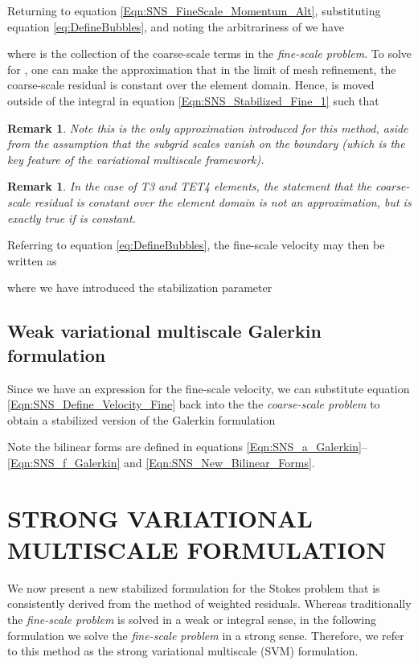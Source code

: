 \documentclass[11pt]{amsart}
\newtheorem{remark}[theorem]{Remark}
\begin{document}
Returning to equation \eqref{Eqn:SNS_FineScale_Momentum_Alt}, substituting equation \eqref{eq:DefineBubbles}, and noting the arbitrariness of  we have

where  is the collection of the coarse-scale terms in the \emph{fine-scale problem}. To solve for , one can make the approximation that in the limit of mesh refinement, the coarse-scale residual is constant over the element domain.  Hence,  is moved outside of the integral in equation \eqref{Eqn:SNS_Stabilized_Fine_1} such that 

\begin{remark}
Note this is the only approximation introduced for this method, aside from the assumption that the subgrid scales vanish on the boundary (which is the key feature of the variational multiscale framework).
\end{remark}
\begin{remark}
\label{remark:ResidRemark}
In the case of T3 and TET4 elements, the statement that the coarse-scale residual is constant over the element domain is not an approximation, but is exactly true if  is constant.
\end{remark}
Referring to equation \eqref{eq:DefineBubbles}, the fine-scale velocity may then be written as

where we have introduced the stabilization parameter 


\subsection{Weak variational multiscale Galerkin formulation}
Since we have an expression for the fine-scale velocity, we can substitute equation \eqref{Eqn:SNS_Define_Velocity_Fine} back into the the \emph{coarse-scale problem} to obtain a stabilized version of the Galerkin formulation

Note the bilinear forms are defined in equations \eqref{Eqn:SNS_a_Galerkin}--\eqref{Eqn:SNS_f_Galerkin} and \eqref{Eqn:SNS_New_Bilinear_Forms}.



 \section{STRONG VARIATIONAL MULTISCALE FORMULATION}
We now present a new stabilized formulation for the Stokes problem that is consistently derived from the method of weighted residuals.  Whereas traditionally the \emph{fine-scale problem} is solved in a weak or integral sense, in the following formulation we solve the \emph{fine-scale problem} in a strong sense.  Therefore, we refer to this method as the strong variational multiscale (SVM) formulation.  
\end{document}
